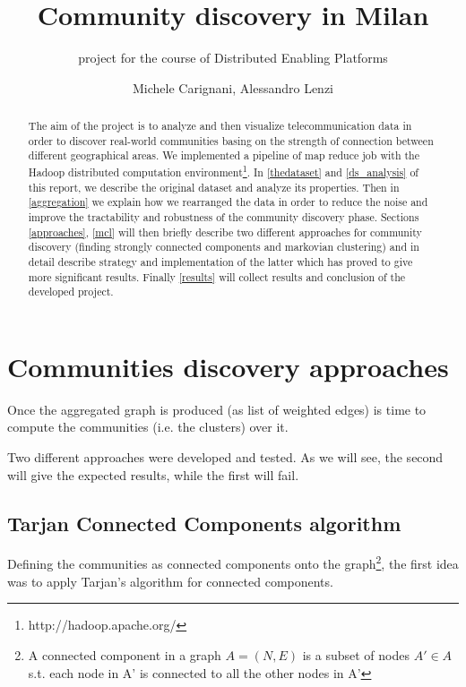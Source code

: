 \documentclass[12pt,a4paper]{article}
\author{Michele Carignani, Alessandro Lenzi}
\title{Community discovery in Milan}
\subtitle{project for the course of Distributed Enabling Platforms}
\begin{document}
\maketitle
\tableofcontents

\begin{abstract}
The aim of the project is to analyze and then visualize telecommunication data
in order to discover real-world communities basing on the strength of connection
between different geographical areas. We implemented a pipeline of
map reduce job with the Hadoop distributed computation
environment\footnote{http://hadoop.apache.org/}.
In \ref{thedataset} and \ref{ds_analysis} of this report, we describe the original dataset
and analyze its properties. Then in \ref{aggregation}
we explain how we rearranged the data in
order to reduce the noise and improve the tractability and robustness of the
community discovery phase. Sections \ref{approaches}, \ref{mcl} will then
briefly describe two different approaches for community discovery
(finding strongly connected components and markovian clustering)
and in detail describe strategy and implementation of the latter which has
proved to give more significant results.
Finally \ref{results} will collect results and conclusion of the developed project.
\end{abstract}






\section{Communities discovery approaches}
\label{approaches}

Once the aggregated graph is produced (as list of weighted edges) is time to compute
the communities (i.e. the clusters) over it.

Two different approaches were developed and tested. 
As we will see, the second will give the
expected results, while the first will fail.

\subsection{Tarjan Connected Components algorithm}

Defining the communities as connected components onto the graph\footnote{A connected component
in a graph $A = (N,E)$ is a subset of nodes $A' \in A$  s.t. each node in A' is connected to 
all the other nodes in A' 
}, the first idea was to apply Tarjan's algorithm for connected components.
\end{document}
